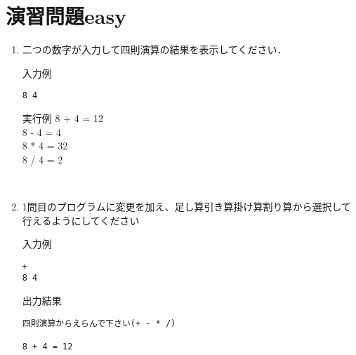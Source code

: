 \section{演習問題easy}
\begin{enumerate}
\item 二つの数字が入力して四則演算の結果を表示してください．
\begin{itembox}{入力例}
\begin{verbatim}
8 4
\end{verbatim}
\end{itembox}

\begin{itembox}{実行例}
8 + 4 = 12\\
8 - 4 = 4\\
8 * 4 = 32\\
8 / 4 = 2
\end{itembox}
\\
\item 1問目のプログラムに変更を加え、足し算引き算掛け算割り算から選択して行えるようにしてください
\begin{itembox}{入力例}
\begin{verbatim}
+
8 4
\end{verbatim}
\end{itembox}

\begin{itembox}{出力結果}
\begin{verbatim}
四則演算からえらんで下さい(+ - * /)

8 + 4 = 12
\end{verbatim}
\end{itembox}

\end{enumerate}